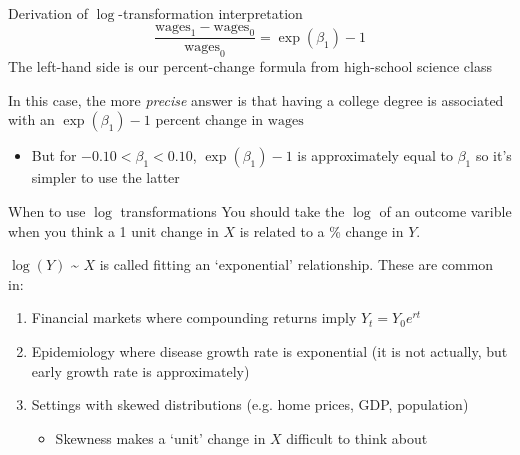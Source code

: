 \documentclass[aspectratio=169,t,11pt,table]{beamer}
\begin{document}
\begin{frame}{Derivation of $\log$-transformation interpretation}
  \vspace*{-\bigskipamount}
  $$
    \frac{\text{wages}_1 - \text{wages}_0}{\text{wages}_0} = \exp(\beta_1) - 1
  $$
  The left-hand side is our percent-change formula from high-school science class

  \pause
  \bigskip
  In this case, the more \emph{precise} answer is that having a college degree is associated with an $\exp(\beta_1) - 1$ percent change in $\text{wages}$
  \begin{itemize}
    \item But for $-0.10 < \beta_1 < 0.10$, $\exp(\beta_1) - 1$ is approximately equal to $\beta_1$ so it's simpler to use the latter
  \end{itemize}
\end{frame}



\begin{frame}{When to use $\log$ transformations}
  You should take the $\log$ of an outcome varible when you think a 1 unit change in $X$ is related to a \% change in $Y$. 

  \pause
  \bigskip
  $\log(Y)$ \textasciitilde{} $X$ is called fitting an `exponential' relationship. These are common in:
  \begin{enumerate}
    \item Financial markets where compounding returns imply $Y_t = Y_0 e^{rt}$
    
    \item Epidemiology where disease growth rate is exponential (it is not actually, but early growth rate is approximately)
    
    \pause
    \item Settings with skewed distributions (e.g. home prices, GDP, population)
    \begin{itemize}
      \item Skewness makes a `unit' change in $X$ difficult to think about
    \end{itemize}
  \end{enumerate}
\end{frame}
\end{document}
